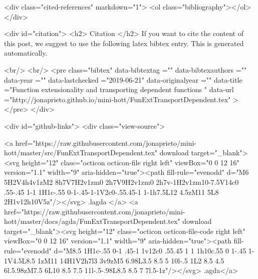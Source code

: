   <div class="cited-references" markdown="1">
  <ol class="bibliography"></ol>
  </div>


  
  <div id="citation">
  <h2> Citation </h2>
  If you want to cite the content of this post,
  we suggest to use the following latex bibtex entry.
  This is generated automatically.

  <br/>
  <br/>
  <pre class="bibtex"
       data-bibtextag =""
       data-bibtexauthors =""
       data-year =""
       data-lastchecked ="2019-06-21"
       data-originalyear =""
       data-title ="Function extensionality and transporting dependent functions "
       data-url ="http://jonaprieto.github.io/mini-hott/FunExtTransportDependent.tex"
  ></pre>
  </div>
  

  <div id="github-links">
    <div class="view-source">
      
        <a href="https://raw.githubusercontent.com/jonaprieto/mini-hott/master/src/FunExtTransportDependent.tex" download target="_blank"><svg height="12" class="octicon octicon-file right left" viewBox="0 0 12 16" version="1.1" width="9" aria-hidden="true"><path fill-rule="evenodd" d="M6 5H2V4h4v1zM2 8h7V7H2v1zm0 2h7V9H2v1zm0 2h7v-1H2v1zm10-7.5V14c0 .55-.45 1-1 1H1c-.55 0-1-.45-1-1V2c0-.55.45-1 1-1h7.5L12 4.5zM11 5L8 2H1v12h10V5z"/></svg> .lagda </a>
        <a href="https://raw.githubusercontent.com/jonaprieto/mini-hott/master/docs/agda/FunExtTransportDependent.tex" download target="_blank"><svg height="12" class="octicon octicon-file-code right left" viewBox="0 0 12 16" version="1.1" width="9" aria-hidden="true"><path fill-rule="evenodd" d="M8.5 1H1c-.55 0-1 .45-1 1v12c0 .55.45 1 1 1h10c.55 0 1-.45 1-1V4.5L8.5 1zM11 14H1V2h7l3 3v9zM5 6.98L3.5 8.5 5 10l-.5 1L2 8.5 4.5 6l.5.98zM7.5 6L10 8.5 7.5 11l-.5-.98L8.5 8.5 7 7l.5-1z"/></svg> .agda</a>
      
